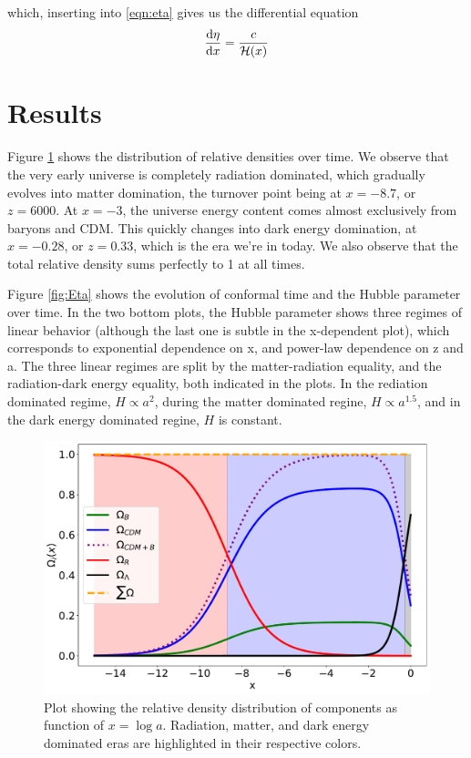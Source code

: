 \documentclass[a4paper]{article}
\begin{document}
which, inserting into \ref{eqn:eta} gives us the differential equation
\begin{align*}
    \dv{\eta}{x} = \frac{c}{\mathcal{H}(x)}
\end{align*}


\section{Results}
Figure \ref{fig:Omegas} shows the distribution of relative densities over time. We observe that the very early universe is completely radiation dominated, which gradually evolves into matter domination, the turnover point being at $x=-8.7$, or $z=6000$. At $x=-3$, the universe energy content comes almost exclusively from baryons and CDM. This quickly changes into dark energy domination, at $x=-0.28$, or $z=0.33$, which is the era we're in today. We also observe that the total relative density sums perfectly to 1 at all times.

Figure \ref{fig:Eta} shows the evolution of conformal time and the Hubble parameter over time. In the two bottom plots, the Hubble parameter shows three regimes of linear behavior (although the last one is subtle in the x-dependent plot), which corresponds to exponential dependence on x, and power-law dependence on z and a. The three linear regimes are split by the matter-radiation equality, and the radiation-dark energy equality, both indicated in the plots. In the rediation dominated regime, $H \propto a^2$, during the matter dominated regine, $H \propto a^{1.5}$, and in the dark energy dominated regine, $H$ is constant.



\begin{figure}[H]
    \centering
    \includegraphics[scale=0.4]{../figs/Omegas.pdf}
    \caption{Plot showing the relative density distribution of components as function of $x=\log{a}$. Radiation, matter, and dark energy dominated eras are highlighted in their respective colors.}
    \label{fig:Omegas}
\end{figure}
\end{document}
